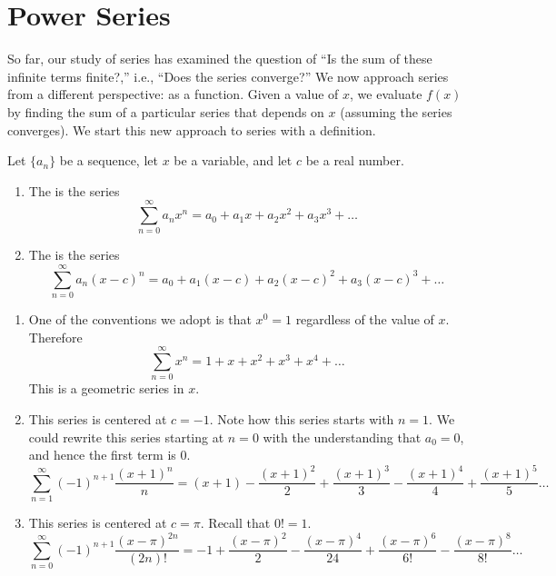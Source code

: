 \section{Power Series}\label{sec:power_series}

So far, our study of series has examined the question of ``Is the sum of these infinite terms finite?,'' i.e., ``Does the series converge?'' We now approach series from a different perspective: as a function. Given a value of $x$, we evaluate $f(x)$ by finding the sum of a particular series that depends on $x$ (assuming the series converges). We start this new approach to series with a definition.

{Let $\{a_n\}$ be a sequence, let $x$ be a variable, and let $c$ be a real number.
	\begin{enumerate}
		\item The  is the series
		$$\sum_{n=0}^\infty a_nx^n = a_0+a_1x+a_2x^2+a_3x^3+\ldots$$
		
		\item The  is the series
		$$\sum_{n=0}^\infty a_n(x-c)^n = a_0+a_1(x-c)+a_2(x-c)^2+a_3(x-c)^3+\ldots$$
	\end{enumerate}
}

{\begin{enumerate}
	\item One of the conventions we adopt is that $x^0=1$ regardless of the value of $x$. Therefore
	$$\sum_{n=0}^\infty x^n = 1+x+x^2+x^3+x^4+\ldots$$
	This is a geometric series in $x$.
	
	\item	This series is centered at $c=-1$. Note how this series starts with $n=1$. We could rewrite this series starting at $n=0$ with the understanding that $a_0=0$, and hence the first term is $0$.
	$$\sum_{n=1}^\infty (-1)^{n+1}\frac{(x+1)^n}n = (x+1) - \frac{(x+1)^2}{2} + \frac{(x+1)^3}{3} - \frac{(x+1)^4}{4}+\frac{(x+1)^5}{5}\ldots$$
	
	\item		This series is centered at $c=\pi$. Recall that $0!=1$.
	$$\sum_{n=0}^\infty (-1)^{n+1} \frac{(x-\pi)^{2n}}{(2n)!} = -1+\frac{(x-\pi)^2}{2} - \frac{(x-\pi)^4}{24}+ \frac{(x-\pi)^6}{6!}-\frac{(x-\pi)^8}{8!}\ldots $$
\end{enumerate}
\baselineskip
}\\

